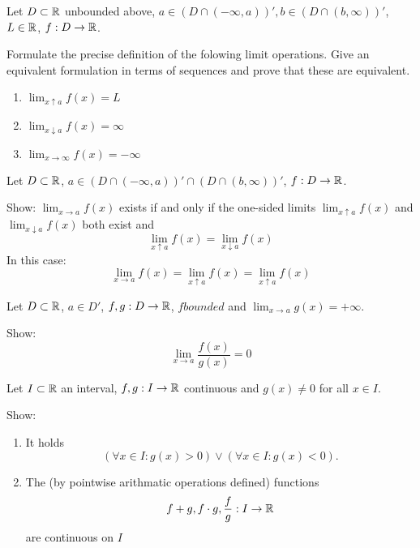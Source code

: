 \documentclass[week=6]{homework}
\date{\today}
\begin{document}
    \maketitle
    \thispagestyle{empty}
    \newpage
    \begin{questions}
		\let\firstquestion\question
		\renewcommand*{\question}{\vspace{7mm}\firstquestion}
        \firstquestion
        Let $D \subset \mathbb{R}$ unbounded above, $a \in (D \cap (-\infty,a))', b \in (D \cap (b,\infty))'$, $L \in \mathbb{R}$, $f : D \to \mathbb{R}$. 
        
        Formulate the precise definition of the folowing limit operations. Give an equivalent formulation in terms of sequences and prove that these are equivalent. 
        
        \begin{enumerate}
        	\item $\lim_{x \uparrow a} f(x) = L$
        	\item $\lim_{x \downarrow a} f(x) = \infty$
        	\item $\lim_{x \to \infty} f(x) = - \infty$
        \end{enumerate}
        
        \question
        Let $D \subset \mathbb{R}$, $a \in (D \cap (-\infty,a))' \cap (D \cap (b,\infty))'$, $f : D \to \mathbb{R}$. 
        
        Show: $\lim_{x \to a} f(x)$ exists if and only if the one-sided limits $\lim_{x \uparrow a} f(x)$ and $\lim_{x \downarrow a} f(x)$ both exist and 
        \[
	        \lim_{x \uparrow a} f(x) = \lim_{x \downarrow a} f(x)
        \]
        In this case:
        \[
	        \lim_{x \to a} f(x) = \lim_{x \uparrow a} f(x) = \lim_{x \uparrow a} f(x)
        \]
        
        \question
        Let $D \subset \mathbb{R} $, $a \in D'$, $f, g : D \to \mathbb{R}$, $f bounded$ and $\lim_{x \to a} g(x) = +\infty$. 
        
        Show:
        \[
	        \lim_{x \to a} \frac{f(x)}{g(x)} = 0
        \]
        
        \question
        Let $I \subset \mathbb{R}$ an interval, $f, g : I \to \mathbb{R}$ continuous and $g(x) \neq 0$ for all $x \in I$. 
        
        Show:
        
        \begin{enumerate}
        	\item It holds 
        	\[
	        	(\forall x \in I : g(x) > 0) \vee (\forall x \in I : g(x) < 0).
        	\]
        	\item The (by pointwise arithmatic operations defined) functions 
        	\[
	        	f + g, f \cdot g, \frac{f}{g} : I \to \mathbb{R}
        	\]
        	are continuous on $I$
        \end{enumerate}
        

\end{questions}
\end{document}
